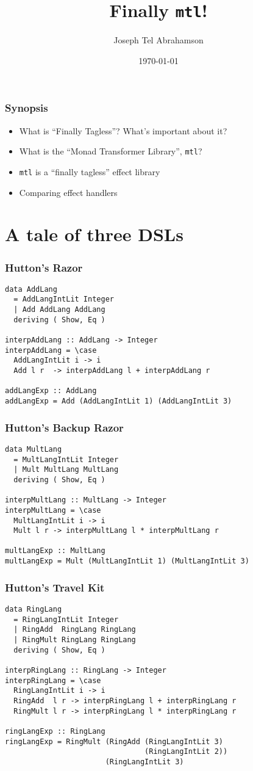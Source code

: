 \documentclass[pdf]{beamer}
\title{Finally \texttt{mtl}!}
\date{\today}
\author{Joseph Tel Abrahamson}
\begin{document}
\maketitle

\begin{frame}
  \frametitle{Synopsis}
  \begin{itemize}
  \item What is ``Finally Tagless''? What's important about it?
  \item What is the ``Monad Transformer Library'', \texttt{mtl}?
  \item \texttt{mtl} is a ``finally tagless'' effect library
  \item Comparing effect handlers
  \end{itemize}
\end{frame}

\section{A tale of three DSLs}

\begin{frame}[fragile]
  \frametitle{Hutton's Razor}
\begin{lstlisting}
data AddLang
  = AddLangIntLit Integer
  | Add AddLang AddLang
  deriving ( Show, Eq )

interpAddLang :: AddLang -> Integer
interpAddLang = \case
  AddLangIntLit i -> i
  Add l r  -> interpAddLang l + interpAddLang r

addLangExp :: AddLang
addLangExp = Add (AddLangIntLit 1) (AddLangIntLit 3)
\end{lstlisting}
\end{frame}

\begin{frame}[fragile]
  \frametitle{Hutton's Backup Razor}
\begin{lstlisting}
data MultLang
  = MultLangIntLit Integer
  | Mult MultLang MultLang
  deriving ( Show, Eq )

interpMultLang :: MultLang -> Integer
interpMultLang = \case
  MultLangIntLit i -> i
  Mult l r -> interpMultLang l * interpMultLang r

multLangExp :: MultLang
multLangExp = Mult (MultLangIntLit 1) (MultLangIntLit 3)
\end{lstlisting}
\end{frame}

\begin{frame}[fragile]
  \frametitle{Hutton's Travel Kit}
\begin{lstlisting}
data RingLang
  = RingLangIntLit Integer
  | RingAdd  RingLang RingLang
  | RingMult RingLang RingLang
  deriving ( Show, Eq )

interpRingLang :: RingLang -> Integer
interpRingLang = \case
  RingLangIntLit i -> i
  RingAdd  l r -> interpRingLang l + interpRingLang r
  RingMult l r -> interpRingLang l * interpRingLang r

ringLangExp :: RingLang
ringLangExp = RingMult (RingAdd (RingLangIntLit 3) 
                                (RingLangIntLit 2)) 
                       (RingLangIntLit 3)
\end{lstlisting}
\end{frame}
\end{document}
